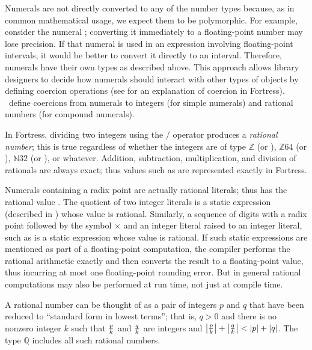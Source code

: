 Numerals are not directly converted to any of the number types
because, as in common mathematical usage,
we expect them to be polymorphic.
For example, consider the numeral ;
converting it immediately to a floating-point number
may lose precision.
If that numeral is used in an expression
involving floating-point intervals,
it would be better to convert it directly to an interval.
Therefore, numerals have their own types as described above.
This approach allows library designers to decide how numerals should
interact with other types of objects by defining coercion operations
(see  for an explanation of coercion
in Fortress).
\Library\ define coercions
from numerals to integers (for simple numerals)
and rational numbers (for compound numerals).


In Fortress, dividing two integers using the $/$ operator produces
a \emph{rational number};
this is true regardless of whether
the integers are of type $\mathbb{Z}$ (or ),
$\mathbb{Z}64$ (or ), $\mathbb{N}32$ (or ), or
whatever.  Addition, subtraction, multiplication, and division of rationals
are always exact; thus values such as  are represented exactly in
Fortress.

Numerals containing a radix point are actually rational
literals; thus  has the rational value .
The quotient of two integer literals is a static expression
(described in ) whose value is rational.
Similarly, a sequence of digits with a radix point followed by the symbol
$\times$ and an integer literal raised to an integer literal,
such as 
is a static expression whose value is rational.
If such static expressions are mentioned as part of a floating-point
computation, the compiler performs the rational arithmetic exactly and then
converts the result to a floating-point value, thus incurring
at most one floating-point rounding error.
But in general rational computations may also be performed at run time,
not just at compile time.


A rational number can be thought of as a pair of integers $p$ and $q$
that have been reduced to ``standard form in lowest terms'';
that is, $q > 0$ and there is no nonzero integer $k$
such that $p \over k$ and $q \over k$ are integers
and $\left| {p \over k} \right| + \left| {q \over k} \right|
	< \left| p \right| + \left| q \right|$.
The type $\mathbb{Q}$ includes all such rational numbers.

